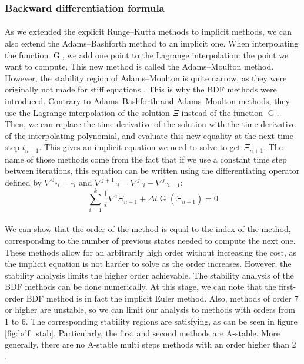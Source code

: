       \subsubsection{Backward differentiation formula}

        \paragraph{}
        As we extended the explicit Runge--Kutta methods to implicit methods, we can also extend the Adams--Bashforth method to an implicit one.
        When interpolating the function $\operatorname{G}$, we add one point to the Lagrange interpolation: the point we want to compute.
        This new method is called the Adams--Moulton method.
        However, the stability region of Adams--Moulton is quite narrow, as they were originally not made for stiff equations \cite{Iserles2008}.
        This is why the BDF methods were introduced.
        Contrary to Adams--Bashforth and Adams--Moulton methods, they use the Lagrange interpolation of the solution $\Xi$ instead of the function $\operatorname{G}$.
        Then, we can replace the time derivative of the solution with the time derivative of the interpolating polynomial, and evaluate this new equality at the next time step $t_{n+1}$.
        This gives an implicit equation we need to solve to get $\Xi_{n+1}$.
        The name of those methods come from the fact that if we use a constant time step between iterations, this equation can be written using the differentiating operator defined by $\nabla^0 \square_i = \square_i$ and $\nabla^{j+1} \square_i = \nabla^j \square_i - \nabla^j \square_{i-1}$:
        \begin{equation}
          \sum_{i=1}^k \frac{1}{i} \nabla^i \Xi_{n+1} + \Delta t \operatorname{G}\left(\Xi_{n+1}\right) = 0
        \end{equation}

        \paragraph{}
        We can show that the order of the method is equal to the index of the method, corresponding to the number of previous states needed to compute the next one.
        These methods allow for an arbitrarily high order without increasing the cost, as the implicit equation is not harder to solve as the order increases.
        However, the stability analysis limits the higher order achievable.
        The stability analysis of the BDF methods can be done numerically.
        At this stage, we can note that the first-order BDF method is in fact the implicit Euler method.
        Also, methods of order 7 or higher are unstable, so we can limit our analysis to methods with orders from 1 to 6.
        The corresponding stability regions are satisfying, as can be seen in figure \ref{fig:bdf_stab}.
        Particularly, the first and second methods are A-stable.
        More generally, there are no A-stable multi steps methods with an order higher than 2 \cite{Dahlquist1963, HairerWanner1996}.

